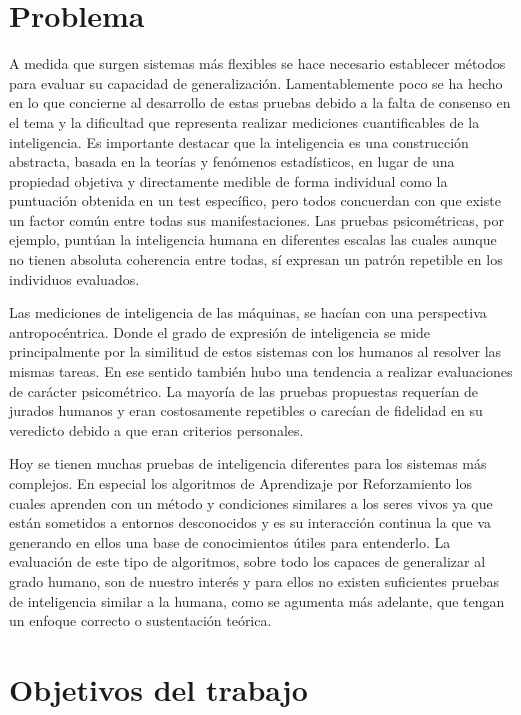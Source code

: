 \section*{Problema}
A medida que surgen sistemas más flexibles se hace necesario establecer métodos para evaluar su capacidad de generalización. Lamentablemente poco se ha hecho en lo que concierne al desarrollo de estas pruebas debido a la falta de consenso en el tema y la dificultad que representa realizar mediciones cuantificables de la inteligencia. Es importante destacar que la inteligencia es una construcción abstracta, basada en la teorías y fenómenos estadísticos, en lugar de una propiedad objetiva y directamente medible de forma individual como la puntuación obtenida en un test específico, pero todos concuerdan con que existe un factor común entre todas sus manifestaciones. Las pruebas psicométricas, por ejemplo, puntúan la inteligencia humana en diferentes escalas las cuales aunque no tienen absoluta coherencia entre todas, sí expresan un patrón repetible en los individuos evaluados. 

Las mediciones de inteligencia de las máquinas, se hacían con una perspectiva antropocéntrica. Donde el grado de expresión de inteligencia se mide principalmente por la similitud de estos sistemas con los humanos al resolver las mismas tareas. En ese sentido también hubo una tendencia a realizar evaluaciones de carácter psicométrico. La mayoría de las pruebas propuestas requerían de jurados humanos y eran costosamente repetibles o carecían de fidelidad en su veredicto debido a que eran criterios personales.

Hoy se tienen muchas pruebas de inteligencia diferentes para los sistemas más complejos. En especial los algoritmos de Aprendizaje por Reforzamiento los cuales aprenden con un método y condiciones similares a los seres vivos ya que están sometidos a entornos desconocidos y es su interacción continua la que va generando en ellos una base de conocimientos útiles para entenderlo. La evaluación de este tipo de algoritmos, sobre todo los capaces de generalizar al grado humano, son de nuestro interés y para ellos no existen suficientes pruebas de inteligencia similar a la humana, como se agumenta más adelante, que tengan un enfoque correcto o sustentación teórica.

\section*{Objetivos del trabajo}

